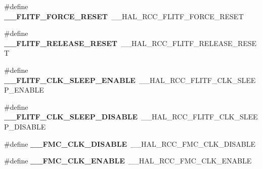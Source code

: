 \begin{DoxyCompactItemize}
\item 
\hypertarget{group___h_a_l___r_c_c___aliased_gaabbf02ca51ae6a097a2c0b12cb99c4a5}{\#define {\bfseries \-\_\-\-\_\-\-F\-L\-I\-T\-F\-\_\-\-F\-O\-R\-C\-E\-\_\-\-R\-E\-S\-E\-T}~\-\_\-\-\_\-\-H\-A\-L\-\_\-\-R\-C\-C\-\_\-\-F\-L\-I\-T\-F\-\_\-\-F\-O\-R\-C\-E\-\_\-\-R\-E\-S\-E\-T}\label{group___h_a_l___r_c_c___aliased_gaabbf02ca51ae6a097a2c0b12cb99c4a5}

\item 
\hypertarget{group___h_a_l___r_c_c___aliased_ga0c5dc3f1f18b878e7e9d6448e603218c}{\#define {\bfseries \-\_\-\-\_\-\-F\-L\-I\-T\-F\-\_\-\-R\-E\-L\-E\-A\-S\-E\-\_\-\-R\-E\-S\-E\-T}~\-\_\-\-\_\-\-H\-A\-L\-\_\-\-R\-C\-C\-\_\-\-F\-L\-I\-T\-F\-\_\-\-R\-E\-L\-E\-A\-S\-E\-\_\-\-R\-E\-S\-E\-T}\label{group___h_a_l___r_c_c___aliased_ga0c5dc3f1f18b878e7e9d6448e603218c}

\item 
\hypertarget{group___h_a_l___r_c_c___aliased_ga6babe617d7f79bed0316d570ad6f6abe}{\#define {\bfseries \-\_\-\-\_\-\-F\-L\-I\-T\-F\-\_\-\-C\-L\-K\-\_\-\-S\-L\-E\-E\-P\-\_\-\-E\-N\-A\-B\-L\-E}~\-\_\-\-\_\-\-H\-A\-L\-\_\-\-R\-C\-C\-\_\-\-F\-L\-I\-T\-F\-\_\-\-C\-L\-K\-\_\-\-S\-L\-E\-E\-P\-\_\-\-E\-N\-A\-B\-L\-E}\label{group___h_a_l___r_c_c___aliased_ga6babe617d7f79bed0316d570ad6f6abe}

\item 
\hypertarget{group___h_a_l___r_c_c___aliased_ga3611eb96ece8835c54951f96d980ae95}{\#define {\bfseries \-\_\-\-\_\-\-F\-L\-I\-T\-F\-\_\-\-C\-L\-K\-\_\-\-S\-L\-E\-E\-P\-\_\-\-D\-I\-S\-A\-B\-L\-E}~\-\_\-\-\_\-\-H\-A\-L\-\_\-\-R\-C\-C\-\_\-\-F\-L\-I\-T\-F\-\_\-\-C\-L\-K\-\_\-\-S\-L\-E\-E\-P\-\_\-\-D\-I\-S\-A\-B\-L\-E}\label{group___h_a_l___r_c_c___aliased_ga3611eb96ece8835c54951f96d980ae95}

\item 
\hypertarget{group___h_a_l___r_c_c___aliased_ga22c7b77b26a0507b21fe61a4e2db31e3}{\#define {\bfseries \-\_\-\-\_\-\-F\-M\-C\-\_\-\-C\-L\-K\-\_\-\-D\-I\-S\-A\-B\-L\-E}~\-\_\-\-\_\-\-H\-A\-L\-\_\-\-R\-C\-C\-\_\-\-F\-M\-C\-\_\-\-C\-L\-K\-\_\-\-D\-I\-S\-A\-B\-L\-E}\label{group___h_a_l___r_c_c___aliased_ga22c7b77b26a0507b21fe61a4e2db31e3}

\item 
\hypertarget{group___h_a_l___r_c_c___aliased_ga407951f6eb69ea219ae97f4e00c1b0b0}{\#define {\bfseries \-\_\-\-\_\-\-F\-M\-C\-\_\-\-C\-L\-K\-\_\-\-E\-N\-A\-B\-L\-E}~\-\_\-\-\_\-\-H\-A\-L\-\_\-\-R\-C\-C\-\_\-\-F\-M\-C\-\_\-\-C\-L\-K\-\_\-\-E\-N\-A\-B\-L\-E}\label{group___h_a_l___r_c_c___aliased_ga407951f6eb69ea219ae97f4e00c1b0b0}


\end{DoxyCompactItemize}
